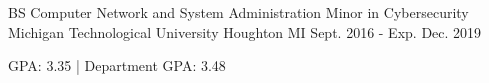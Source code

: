 

\begin{cventries}

  \cventry
    {BS Computer Network and System Administration Minor in Cybersecurity} %
    {Michigan Technological University} %
    {Houghton MI} %
    {Sept. 2016 - Exp. Dec. 2019} %
    {
      \begin{cvitems} %
        \item {GPA: 3.35  |  Department GPA: 3.48}
      \end{cvitems}
    }

\end{cventries}
